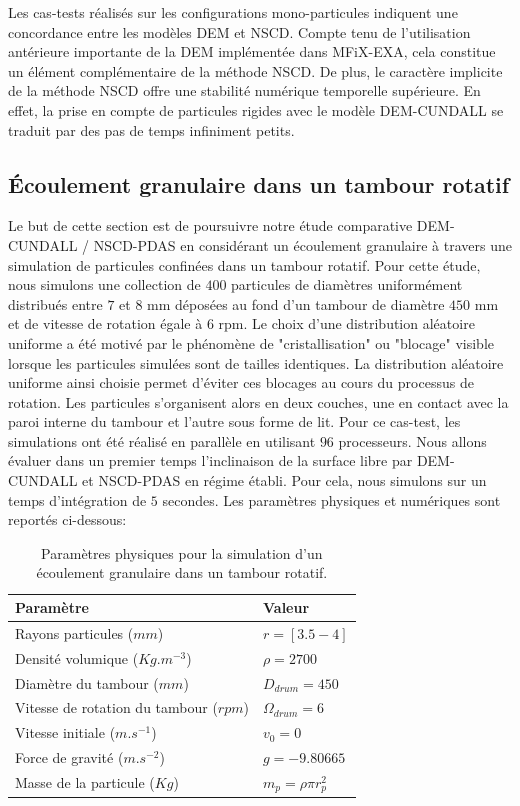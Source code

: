 Les cas-tests réalisés sur les configurations mono-particules indiquent une concordance entre les modèles DEM et NSCD. Compte tenu de l'utilisation antérieure importante de la DEM implémentée dans MFiX-EXA, cela constitue un élément complémentaire de la méthode NSCD. De plus, le caractère implicite de la méthode NSCD offre une stabilité numérique temporelle supérieure. En effet, la prise en compte de particules rigides avec le modèle DEM-CUNDALL se traduit par des pas de temps infiniment petits.


\subsection{Écoulement granulaire dans un tambour rotatif}

Le but de cette section est de poursuivre notre étude comparative DEM-CUNDALL / NSCD-PDAS en considérant un écoulement granulaire à travers une simulation de particules confinées dans un tambour rotatif. Pour cette étude, nous simulons une collection de $400$ particules de diamètres uniformément distribués entre $7$ et $8$ mm déposées au fond d'un tambour de diamètre $450$ mm et de vitesse de rotation égale à $6$ rpm. Le choix d'une distribution aléatoire uniforme a été motivé par le phénomène de "cristallisation" ou "blocage" visible lorsque les particules simulées sont de tailles identiques. La distribution aléatoire uniforme ainsi choisie permet d'éviter ces blocages au cours du processus de rotation. Les particules s'organisent alors en deux couches, une en contact avec la paroi interne du tambour et l'autre sous forme de lit. Pour ce cas-test, les simulations ont été réalisé en parallèle en utilisant $96$ processeurs. Nous allons évaluer dans un premier temps l'inclinaison de la surface libre par DEM-CUNDALL et NSCD-PDAS en régime établi. Pour cela, nous simulons sur un temps d'intégration de $5$ secondes. Les paramètres physiques et numériques sont reportés ci-dessous:

\begin{center}
\begin{table}[!h]
\begin{tabular}{ |p{6.5cm}|p{6.1cm}| }
 \hline \rowcolor{lightgray}
 Paramètre& Valeur\\
 \hline
 Rayons particules  ($mm$) & $r = [3.5 - 4]$\\
 Densité volumique ($Kg.m^{-3}$)& $\rho = 2700$\\
 Diamètre du tambour ($mm$) & $D_{drum} = 450$\\
 Vitesse de rotation du tambour ($rpm$) & $\Omega_{drum} = 6$\\
 Vitesse initiale  ($m.s^{-1}$)  &$v_0 = 0$\\
 Force de gravité ($m.s^{-2}$)& $g = -9.80665$\\
 Masse de la particule ($Kg$)  &$m_p = \rho \pi r_p^{2}$\\
 \hline
\end{tabular}
\caption{Paramètres physiques pour la simulation d'un écoulement granulaire dans un tambour rotatif.}\label{tab_45}
\end{table}
\end{center}

